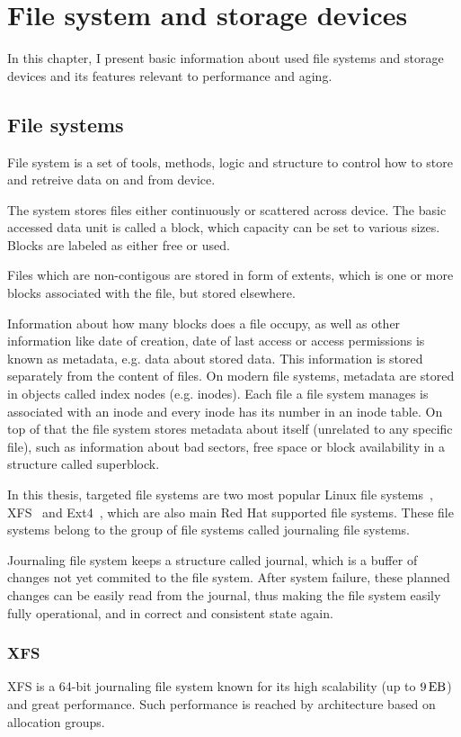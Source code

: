 \documentclass[
  color, %
  table, %
  lof,   %
  lot,   %
]{fithesis3}
\begin{document}
\chapter{File system and storage devices}
\label{fs}
In this chapter, I present basic information about used file systems and storage devices and its features relevant to performance and aging.

\section{File systems}
File system is a set of tools, methods, logic and structure to control how to store and retreive data on and from device.

The system stores files either continuously or scattered across device. The basic accessed data unit is called a block, which capacity can be set to various sizes. Blocks are labeled as either free or used.

Files which are non-contigous are stored in form of extents, which is one or more blocks associated with the file, but stored elsewhere.  

Information about how many blocks does a file occupy, as well as other information like date of creation, date of last access or access permissions is known as metadata, e.g. data about stored data. This information is stored separately from the content of files. On modern file systems, metadata are stored in objects called index nodes (e.g. inodes). Each file a file system manages is associated with an inode and every inode has its number in an inode table. On top of that the file system stores metadata about itself (unrelated to any specific file), such as information about bad sectors, free space or block availability in a structure called superblock.

In this thesis, targeted file systems are two most popular Linux file systems~\cite{Lu:2013:SLF:2591272.2591276}, XFS~\cite{xfs:qhe} and Ext4~\cite{ext4:qhe}, which are also main Red Hat supported file systems. These file systems belong to the group of file systems called journaling file systems.


Journaling file system keeps a structure called journal, which is a buffer of changes not yet commited to the file system. After system failure, these planned changes can be easily read from the journal, thus making the file system easily fully operational, and in correct and consistent state again.

\subsection{XFS}
XFS is a 64-bit journaling file system known for its high scalability (up to $\SI{9}{\exa\byte}$) and great performance. Such performance is reached by architecture based on allocation groups.
\end{document}

